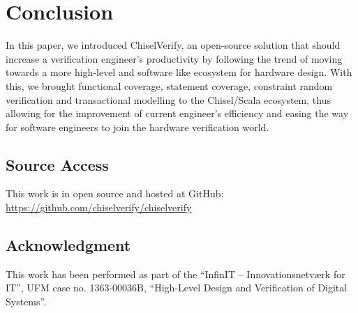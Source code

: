 \documentclass[conference]{IEEEtran}
\begin{document}
\section{Conclusion}
In this paper, we introduced ChiselVerify, an open-source solution that should increase a verification engineer's productivity by following the trend of moving towards a more high-level and software like ecosystem for hardware design. With this, we brought functional coverage, statement coverage, constraint random verification and transactional modelling to the Chisel/Scala ecosystem, thus allowing for the improvement of current engineer's efficiency and easing the way for software engineers to join the hardware verification world.

\subsection*{Source Access}

This work is in open source and hosted at GitHub: \url{https://github.com/chiselverify/chiselverify}

\subsection*{Acknowledgment}

This work has been performed as part of the
``InfinIT -- Innovationsnetv{\ae}rk for IT'', UFM case no. 1363-00036B,
``High-Level Design and Verification of Digital Systems''.



\end{document}
